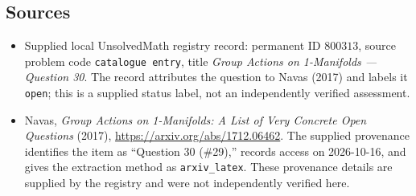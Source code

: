 \documentclass[11pt]{article}
\begin{document}
\subsection{Sources}
\begin{itemize}
\item Supplied local UnsolvedMath registry record: permanent ID \(800313\), source problem code \texttt{catalogue entry}, title \emph{Group Actions on 1-Manifolds --- Question 30}. The record attributes the question to Navas (2017) and labels it \texttt{open}; this is a supplied status label, not an independently verified assessment.
\item Navas, \emph{Group Actions on 1-Manifolds: A List of Very Concrete Open Questions} (2017), \url{https://arxiv.org/abs/1712.06462}. The supplied provenance identifies the item as ``Question 30 (\#29),'' records access on 2026-10-16, and gives the extraction method as \texttt{arxiv\_latex}. These provenance details are supplied by the registry and were not independently verified here.
\end{itemize}
\end{document}
